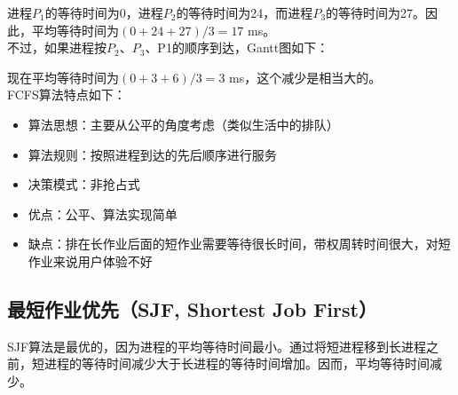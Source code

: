 进程$ P_1 $的等待时间为0，进程$ P_2 $的等待时间为24，而进程$ P_3 $的等待时间为27。因此，平均等待时间为$ (0 + 24 + 27) / 3 = 17 $ ms。\\

不过，如果进程按$ P_2 $、$ P_3 $、P1的顺序到达，Gantt图如下：

\begin{figure}[H]
    \centering
\end{figure}

现在平均等待时间为$ (0 + 3 + 6) / 3 = 3$ ms，这个减少是相当大的。\\

FCFS算法特点如下：

\begin{itemize}
    \item 算法思想：主要从公平的角度考虑（类似生活中的排队）

    \item 算法规则：按照进程到达的先后顺序进行服务

    \item 决策模式：非抢占式

    \item 优点：公平、算法实现简单

    \item 缺点：排在长作业后面的短作业需要等待很长时间，带权周转时间很大，对短作业来说用户体验不好
\end{itemize}

\vspace{0.5cm}

\subsection{最短作业优先（SJF, Shortest Job First）}

SJF算法是最优的，因为进程的平均等待时间最小。通过将短进程移到长进程之前，短进程的等待时间减少大于长进程的等待时间增加。因而，平均等待时间减少。\\

